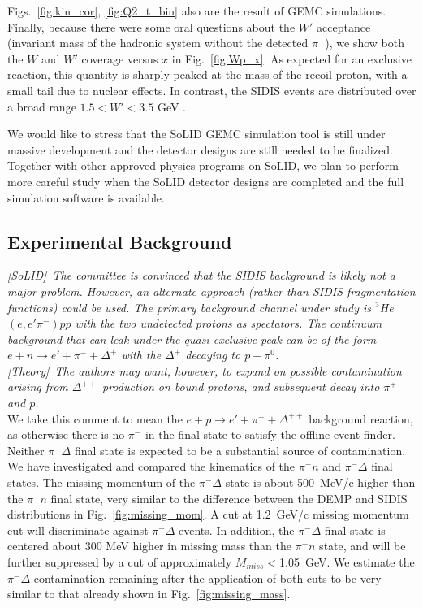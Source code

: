 Figs.~\ref{fig:kin_cor}, \ref{fig:Q2_t_bin} also are the result of GEMC
simulations.  Finally, because there were some oral questions about the $W'$
acceptance (invariant mass of the hadronic system without the detected
$\pi^-$), we show both the $W$ and $W'$ coverage versus $x$ in
Fig.~\ref{fig:Wp_x}.  As expected for an exclusive reaction, this quantity is
sharply peaked at the mass of the recoil proton, with a small tail due to
nuclear effects.  In contrast, the SIDIS events are distributed over a broad
range $1.5<W'<3.5$ GeV \cite{solid:e12-10-006}.

We would like to stress that the SoLID GEMC simulation tool is still under massive development and the detector designs are still needed to be finalized. Together with other approved physics programs on SoLID, we plan to perform more careful study when the SoLID detector designs are completed and the full simulation software is available.

\subsection{Experimental Background
\label{sec:resp_bkd}}

{\it [SoLID]\ The committee is convinced that the SIDIS background is likely
  not a major problem.  However, an alternate approach (rather than SIDIS
  fragmentation functions) could be used.  The primary background channel under
  study is $^3$He$(e,e'\pi^-)pp$ with the two undetected protons as spectators.
  The continuum background that can leak under the quasi-exclusive peak can be
  of the form $e+n\rightarrow e'+\pi^-+\Delta^+$ with the $\Delta^+$ decaying
  to $p+\pi^0$.}\\[0.2ex]

{\it [Theory]\ The authors may want, however, to expand on possible
  contamination arising from $\Delta^{++}$ production on bound protons, and
  subsequent decay into $\pi^+$ and $p$.}\\
We take this comment to mean the $e+p\rightarrow e'+\pi^-+\Delta^{++}$
background reaction, as otherwise there is no $\pi^-$ in the final state to
satisfy the offline event finder.\\[0.2ex]

Neither $\pi^-\Delta$ final state is expected to be a substantial source of
contamination.  We have investigated and compared the kinematics of the
$\pi^-n$ and $\pi^-\Delta$ final states.  The missing momentum of the
$\pi^-\Delta$ state is about 500~MeV/c higher than the $\pi^-n$ final state,
very similar to the difference between the DEMP and SIDIS distributions in
Fig.~\ref{fig:missing_mom}.  A cut at 1.2~GeV/c missing momentum cut will 
discriminate against
$\pi^-\Delta$ events.  In addition, the $\pi^-\Delta$ final state is centered
about 300 MeV higher in missing mass than the $\pi^-n$ state, and will be
further suppressed by a cut of approximately $M_{miss}<$1.05~GeV.  We estimate
the $\pi^-\Delta$ contamination remaining after the application of both cuts to
be very similar to that already shown in Fig.~\ref{fig:missing_mass}.

